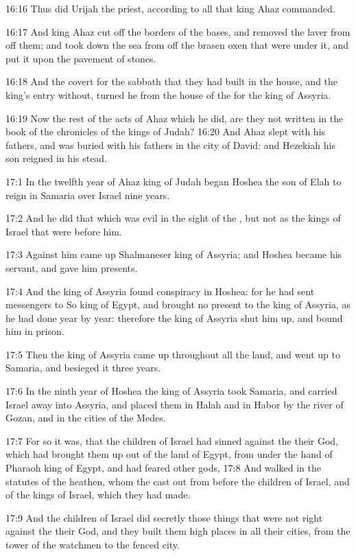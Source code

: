 16:16 Thus did Urijah the priest, according to all that king Ahaz
commanded.

16:17 And king Ahaz cut off the borders of the bases, and removed the
laver from off them; and took down the sea from off the brasen oxen
that were under it, and put it upon the pavement of stones.

16:18 And the covert for the sabbath that they had built in the house,
and the king's entry without, turned he from the house of the \LORD for
the king of Assyria.

16:19 Now the rest of the acts of Ahaz which he did, are they not
written in the book of the chronicles of the kings of Judah?  16:20
And Ahaz slept with his fathers, and was buried with his fathers in
the city of David: and Hezekiah his son reigned in his stead.

17:1 In the twelfth year of Ahaz king of Judah began Hoshea the son of
Elah to reign in Samaria over Israel nine years.

17:2 And he did that which was evil in the sight of the \LORD, but not
as the kings of Israel that were before him.

17:3 Against him came up Shalmaneser king of Assyria; and Hoshea
became his servant, and gave him presents.

17:4 And the king of Assyria found conspiracy in Hoshea: for he had
sent messengers to So king of Egypt, and brought no present to the
king of Assyria, as he had done year by year: therefore the king of
Assyria shut him up, and bound him in prison.

17:5 Then the king of Assyria came up throughout all the land, and
went up to Samaria, and besieged it three years.

17:6 In the ninth year of Hoshea the king of Assyria took Samaria, and
carried Israel away into Assyria, and placed them in Halah and in
Habor by the river of Gozan, and in the cities of the Medes.

17:7 For so it was, that the children of Israel had sinned against the
\LORD their God, which had brought them up out of the land of Egypt,
from under the hand of Pharaoh king of Egypt, and had feared other
gods, 17:8 And walked in the statutes of the heathen, whom the \LORD
cast out from before the children of Israel, and of the kings of
Israel, which they had made.

17:9 And the children of Israel did secretly those things that were
not right against the \LORD their God, and they built them high places
in all their cities, from the tower of the watchmen to the fenced
city.

